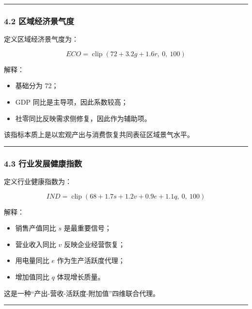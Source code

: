 \documentclass[
]{article}
\providecommand{\tightlist}{%
  \setlength{\itemsep}{0pt}\setlength{\parskip}{0pt}}
\begin{document}
\begin{center}\rule{0.5\linewidth}{0.5pt}\end{center}

\subsubsection{4.2
区域经济景气度}\label{ux533aux57dfux7ecfux6d4eux666fux6c14ux5ea6}

定义区域经济景气度为：

\[
ECO = \operatorname{clip}\left(72 + 3.2g + 1.6r,\ 0,\ 100\right)
\]

解释：

\begin{itemize}
\tightlist
\item
  基础分为 72；
\item
  GDP 同比是主导项，因此系数较高；
\item
  社零同比反映需求侧修复，因此作为辅助项。
\end{itemize}

该指标本质上是以宏观产出与消费恢复共同表征区域景气水平。

\begin{center}\rule{0.5\linewidth}{0.5pt}\end{center}

\subsubsection{4.3
行业发展健康指数}\label{ux884cux4e1aux53d1ux5c55ux5065ux5eb7ux6307ux6570}

定义行业健康指数为：

\[
IND = \operatorname{clip}\left(68 + 1.7s + 1.2v + 0.9e + 1.1q,\ 0,\ 100\right)
\]

解释：

\begin{itemize}
\tightlist
\item
  销售产值同比 \(s\) 是最重要信号；
\item
  营业收入同比 \(v\) 反映企业经营恢复；
\item
  用电量同比 \(e\) 作为生产活跃度代理；
\item
  增加值同比 \(q\) 体现增长质量。
\end{itemize}

这是一种``产出-营收-活跃度-附加值''四维联合代理。

\begin{center}\rule{0.5\linewidth}{0.5pt}\end{center}
\end{document}
